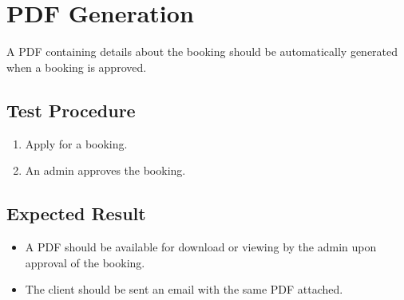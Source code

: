 \documentclass[a4paper, draft]{article}
\begin{document}
\newpage
\section{PDF Generation} \label{pdf}
A PDF containing details about the booking should be automatically generated when a booking is approved.

\subsection{Test Procedure}
\begin{enumerate}
    \item Apply for a booking.
    \item An admin approves the booking.
\end{enumerate}

\subsection{Expected Result}
\begin{itemize}
    \item A PDF should be available for download or viewing by the admin upon approval of the booking.
    \item The client should be sent an email with the same PDF attached.
\end{itemize}
\end{document}

